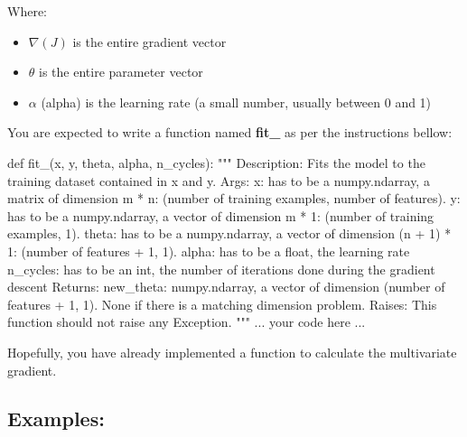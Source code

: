 \documentclass[]{article}
\newenvironment{Shaded}{\begin{snugshade}}{\end{snugshade}}
\newcommand{\CommentTok}[1]{\textcolor[rgb]{0.48,0.49,0.49}{#1}}
\newcommand{\KeywordTok}[1]{\textcolor[rgb]{0.81,0.81,0.76}{#1}}
\newcommand{\NormalTok}[1]{\textcolor[rgb]{0.81,0.81,0.76}{#1}}
\begin{document}
Where:

\begin{itemize}
\item
  \(\nabla{(J)}\) is the entire gradient vector
\item
  \(\theta\) is the entire parameter vector
\item
  \(\alpha\) (alpha) is the learning rate (a small number, usually
  between 0 and 1)
\end{itemize}

You are expected to write a function named \textbf{fit\_} as per the
instructions bellow:

\begin{Shaded}
\begin{Highlighting}[]
\KeywordTok{def}\NormalTok{ fit_(x, y, theta, alpha, n_cycles):}
    \CommentTok{"""}
\CommentTok{    Description:}
\CommentTok{        Fits the model to the training dataset contained in x and y.}
\CommentTok{    Args:}
\CommentTok{        x: has to be a numpy.ndarray, a matrix of dimension m * n: (number of training examples, number of features).}
\CommentTok{        y: has to be a numpy.ndarray, a vector of dimension m * 1: (number of training examples, 1).}
\CommentTok{        theta: has to be a numpy.ndarray, a vector of dimension (n + 1) * 1: (number of features + 1, 1).}
\CommentTok{        alpha: has to be a float, the learning rate}
\CommentTok{        n_cycles: has to be an int, the number of iterations done during the gradient descent}
\CommentTok{    Returns:}
\CommentTok{        new_theta: numpy.ndarray, a vector of dimension (number of features + 1, 1).}
\CommentTok{        None if there is a matching dimension problem.}
\CommentTok{    Raises:}
\CommentTok{        This function should not raise any Exception.}
\CommentTok{    """}
\NormalTok{        ... your code here ...}
\end{Highlighting}
\end{Shaded}

Hopefully, you have already implemented a function to calculate the
multivariate gradient.

\hypertarget{examples-5}{%
\subsection{Examples:}\label{examples-5}}
\end{document}
